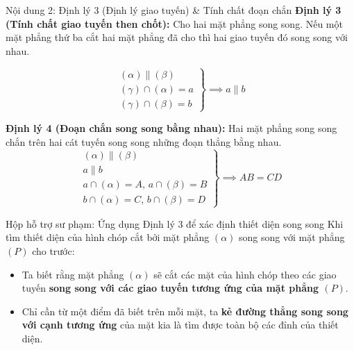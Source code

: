 \documentclass[12pt, a4paper]{article}
\begin{document}
\begin{pedabox}{Nội dung 2: Định lý 3 (Định lý giao tuyến) \& Tính chất đoạn chắn}
\textbf{Định lý 3 (Tính chất giao tuyến then chốt):}
Cho hai mặt phẳng song song. Nếu một mặt phẳng thứ ba cắt hai mặt phẳng đã cho thì hai giao tuyến đó song song với nhau.
\begin{center}
\end{center}
$$\left.\begin{array}{l} (\alpha) \parallel (\beta) \\ (\gamma) \cap (\alpha) = a \\ (\gamma) \cap (\beta) = b \end{array}\right\} \implies a \parallel b$$

\textbf{Định lý 4 (Đoạn chắn song song bằng nhau):}
Hai mặt phẳng song song chắn trên hai cát tuyến song song những đoạn thẳng bằng nhau.
$$\left.\begin{array}{l} (\alpha) \parallel (\beta) \\ a \parallel b \\ a \cap (\alpha) = A, \, a \cap (\beta) = B \\ b \cap (\alpha) = C, \, b \cap (\beta) = D \end{array}\right\} \implies AB = CD$$
\end{pedabox}

\begin{scaffoldbox}{Hộp hỗ trợ sư phạm: Ứng dụng Định lý 3 để xác định thiết diện song song}
Khi tìm thiết diện của hình chóp cắt bởi mặt phẳng $(\alpha)$ song song với mặt phẳng $(P)$ cho trước:
\begin{itemize}[leftmargin=0.6cm]
    \item Ta biết rằng mặt phẳng $(\alpha)$ sẽ cắt các mặt của hình chóp theo các giao tuyến \textbf{song song với các giao tuyến tương ứng của mặt phẳng $(P)$}.
    \item Chỉ cần từ một điểm đã biết trên mỗi mặt, ta \textbf{kẻ đường thẳng song song với cạnh tương ứng} của mặt kia là tìm được toàn bộ các đỉnh của thiết diện.
\end{itemize}
\end{scaffoldbox}
\end{document}
